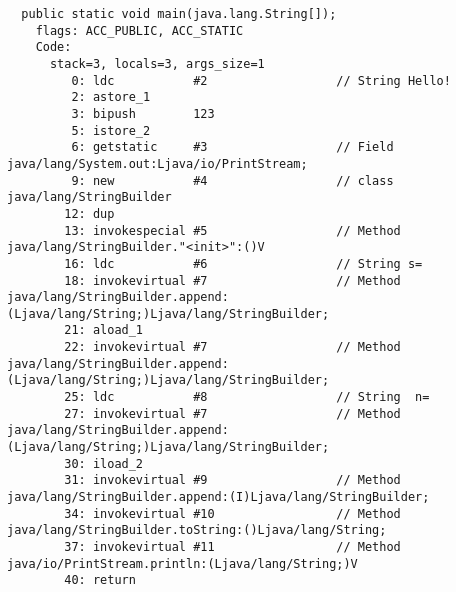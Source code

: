 \begin{lstlisting}
  public static void main(java.lang.String[]);
    flags: ACC_PUBLIC, ACC_STATIC
    Code:
      stack=3, locals=3, args_size=1
         0: ldc           #2                  // String Hello!
         2: astore_1      
         3: bipush        123
         5: istore_2      
         6: getstatic     #3                  // Field java/lang/System.out:Ljava/io/PrintStream;
         9: new           #4                  // class java/lang/StringBuilder
        12: dup           
        13: invokespecial #5                  // Method java/lang/StringBuilder."<init>":()V
        16: ldc           #6                  // String s=
        18: invokevirtual #7                  // Method java/lang/StringBuilder.append:(Ljava/lang/String;)Ljava/lang/StringBuilder;
        21: aload_1       
        22: invokevirtual #7                  // Method java/lang/StringBuilder.append:(Ljava/lang/String;)Ljava/lang/StringBuilder;
        25: ldc           #8                  // String  n=
        27: invokevirtual #7                  // Method java/lang/StringBuilder.append:(Ljava/lang/String;)Ljava/lang/StringBuilder;
        30: iload_2       
        31: invokevirtual #9                  // Method java/lang/StringBuilder.append:(I)Ljava/lang/StringBuilder;
        34: invokevirtual #10                 // Method java/lang/StringBuilder.toString:()Ljava/lang/String;
        37: invokevirtual #11                 // Method java/io/PrintStream.println:(Ljava/lang/String;)V
        40: return        
\end{lstlisting}
